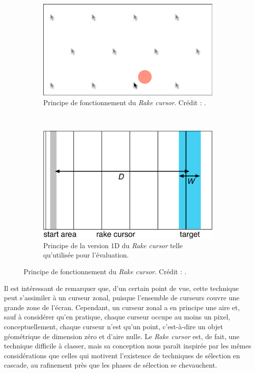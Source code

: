 	\begin{figure}[!htbp]
		\begin{subfigure}[t]{0.49\textwidth}
			\centering
			\includegraphics[width=\textwidth]{figures/ch2/rakeCursor}
			\caption{Principe de fonctionnement du \emph{Rake cursor}. Crédit : \cite{blanch2009rake}.}
			\label{fig:rakeCursor2d}
		\end{subfigure}
		~
		\begin{subfigure}[t]{0.49\textwidth}
			\centering
			\includegraphics[width=\textwidth]{figures/ch2/rakeCursor1d}
			\caption{Principe de la version 1D du \emph{Rake cursor} telle qu'utilisée pour l'évaluation.}
			\label{fig:rakeCursor1d}
		\end{subfigure}
			\caption{Principe de fonctionnement du \emph{Rake cursor}. Crédit : \cite{blanch2009rake}.}
		\label{fig:rakeCursor}
	\end{figure}
	
	Il est intéressant de remarquer que, d'un certain point de vue, cette technique peut s'assimiler à un curseur zonal, puisque l'ensemble de curseurs couvre une grande zone de l'écran. Cependant, un curseur zonal a en principe une aire et, sauf à considérer qu'en pratique, chaque curseur occupe au moins un pixel, conceptuellement, chaque curseur n'est qu'un point, c'est-à-dire un objet géométrique de dimension zéro et d'aire nulle. Le \emph{Rake cursor} est, de fait, une technique difficile à classer, mais sa conception nous paraît inspirée par les mêmes considérations que celles qui motivent l'existence de techniques de sélection en cascade, au rafinement près que les phases de sélection se chevauchent.
	
